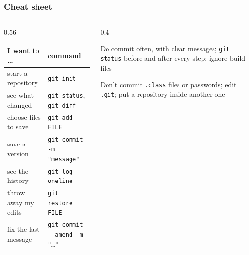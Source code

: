 \documentclass[aspectratio=169,10pt,compress]{beamer}
\begin{document}
\begin{frame}[t,fragile] \frametitle{Cheat sheet}
  \begin{columns}[T]
    \begin{column}{0.56\textwidth}
      \begin{center}\footnotesize
      \begin{tabular}{ll}
        \toprule
        \textbf{I want to \dots}      & \textbf{command} \\
        \midrule
        start a repository           & \texttt{git init} \\
        see what changed             & \texttt{git status}, \texttt{git diff} \\
        choose files to save         & \texttt{git add FILE} \\
        save a version               & \texttt{git commit -m "message"} \\
        see the history              & \texttt{git log -{}-oneline} \\
        throw away my edits          & \texttt{git restore FILE} \\
        fix the last message         & \texttt{git commit -{}-amend -m "\dots"} \\
        \bottomrule
      \end{tabular}
      \end{center}
    \end{column}
    \begin{column}{0.4\textwidth}
      \begin{block}{Do}
        \small commit often, with clear messages; \texttt{git status} before and after every step; ignore build files
      \end{block}
      \begin{block}{Don't}
        \small commit \texttt{.class} files or passwords; edit \texttt{.git}; put a repository inside another one
      \end{block}
    \end{column}
  \end{columns}
\end{frame}
\end{document}
